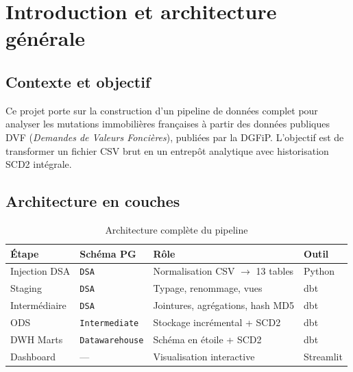 \documentclass[12pt,a4paper]{article}
\let\oldsection\section
\renewcommand{\section}{\clearpage\oldsection}
\begin{document}
\section{Introduction et architecture générale}

\subsection{Contexte et objectif}

Ce projet porte sur la construction d'un pipeline de données complet
pour analyser les mutations immobilières françaises à partir des données
publiques DVF (\textit{Demandes de Valeurs Foncières}), publiées
par la DGFiP. L'objectif est de transformer un fichier CSV brut en un
entrepôt analytique avec historisation SCD2 intégrale.

\subsection{Architecture en couches}

\begin{table}[H]
  \centering
  \begin{tabularx}{\linewidth}{llXl}
    \toprule
    \textbf{Étape} & \textbf{Schéma PG} & \textbf{Rôle} & \textbf{Outil} \\
    \midrule
    Injection DSA    & \texttt{DSA}           & Normalisation CSV $\to$ 13 tables    & Python \\
    Staging          & \texttt{DSA}           & Typage, renommage, vues              & dbt \\
    Intermédiaire    & \texttt{DSA}           & Jointures, agrégations, hash MD5     & dbt \\
    ODS              & \texttt{Intermediate}  & Stockage incrémental + SCD2          & dbt \\
    DWH Marts        & \texttt{Datawarehouse} & Schéma en étoile + SCD2              & dbt \\
    Dashboard        & ---                    & Visualisation interactive            & Streamlit \\
    \bottomrule
  \end{tabularx}
  \caption{Architecture complète du pipeline}
\end{table}
\end{document}
